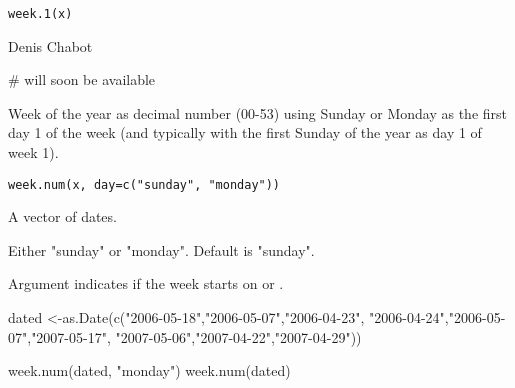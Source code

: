 \documentclass[a4paper]{book}
\begin{document}
%
\begin{Usage}
\begin{verbatim}
week.1(x)
\end{verbatim}
\end{Usage}
%
\begin{Arguments}
\begin{ldescription}
\item[\code{x}] 


\end{ldescription}
\end{Arguments}
%
\begin{Author}\relax
Denis Chabot
\end{Author}
%
\begin{Examples}
\begin{ExampleCode}
# will soon be available
\end{ExampleCode}
\end{Examples}
\newpage
{}
%
\begin{Description}\relax
Week of the year as decimal number (00-53) using Sunday or Monday as 
the first day 1 of the week (and typically with the first Sunday of the year as day 1 of week 1).
\end{Description}
%
\begin{Usage}
\begin{verbatim}
week.num(x, day=c("sunday", "monday"))
\end{verbatim}
\end{Usage}
%
\begin{Arguments}
\begin{ldescription}
\item[\code{x}] 
A vector of dates.

\item[\code{day}] 
Either "sunday" or "monday". Default is "sunday".

\end{ldescription}
\end{Arguments}
%
\begin{Details}\relax
Argument  indicates if the week starts on  or .
\end{Details}
%
\begin{Examples}
\begin{ExampleCode}
dated <-as.Date(c("2006-05-18","2006-05-07","2006-04-23",
                  "2006-04-24","2006-05-07","2007-05-17",
                  "2007-05-06","2007-04-22","2007-04-29"))
                  
week.num(dated, "monday")
week.num(dated)
\end{ExampleCode}
\end{Examples}
\end{document}
